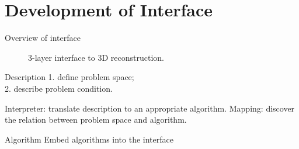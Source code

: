 \documentclass[10pt]{beamer}
\begin{document}
\section{Development of Interface}
\begin{frame}{Overview of interface}
\begin{figure}
\centering
{}
\caption{3-layer interface to 3D reconstruction.}
\end{figure}

\begin{exampleblock}{Description}
  1. define problem space; \\
  2. describe problem condition.
\end{exampleblock}
\begin{exampleblock}{Interpreter: translate description to an appropriate algorithm.}
  Mapping: discover the relation between problem space and algorithm.
\end{exampleblock}
\begin{exampleblock}{Algorithm}
  Embed algorithms into the interface
\end{exampleblock}

\end{frame}

\end{document}
